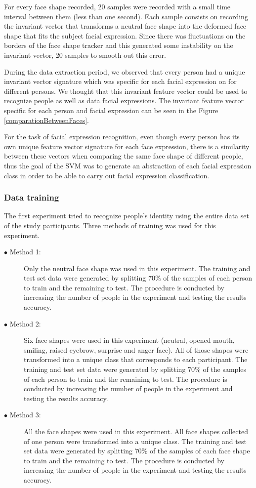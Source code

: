 \documentclass[]{article}
\begin{document}
For every face shape recorded, 20 samples were recorded with a small time
interval between them (less than one second). Each sample consists on recording
the invariant vector that transforms a neutral face shape into the deformed
face shape that fits the subject facial expression. Since there was fluctuations on the borders
of the face shape tracker and this generated some instability on the
invariant vector, 20 samples to smooth out this error.

During the data extraction period, we observed that every person had a unique invariant vector signature which was
specific for each facial expression on for different persons. We thought that this invariant feature vector could be
used to recognize people as well as data facial expressions. The invariant feature vector specific for each person and
facial expression can be seen in the Figure \ref{comparationBetweenFaces}.

For the task of facial expression recognition, even though every person has its own unique feature vector signature for
each face expression, there is a similarity between these vectors when comparing the same face shape of different
people, thus the goal of the SVM was to generate an abstraction of each facial expression class in order to be able to
carry out facial expression classification.

\subsubsection{Data training}

The first experiment tried to recognize people's identity using the entire data
set of the study participants. Three methods of training was used for this
experiment.
\begin{description}
\item[$\bullet$ Method 1:]Only the neutral face shape was used in this
experiment.  The training and test set data were generated by splitting 70\% of
the samples of each person to train and the remaining to test. The procedure is
conducted by increasing the number of people in the experiment and testing the 
results accuracy.
\item[$\bullet$ Method 2:]Six face shapes were used in this experiment (neutral,
opened mouth, smiling, raised eyebrow, surprise and anger face). All of those
shapes were transformed into a unique class that corresponds to each
participant. The training and test set data were generated by splitting 70\% of
the samples of each person to train and the remaining to test. The procedure is conducted by
increasing the number of people in the experiment and testing the results
accuracy.
\item[$\bullet$ Method 3:]All the face shapes were used in this experiment. All
face shapes collected of one person were transformed into a unique class. The
training and test set data were generated by splitting 70\% of the samples of
each face shape to train and the remaining to test. The procedure is conducted
by increasing the number of people in the experiment and testing the results
accuracy.
\end{description}
\end{document}
